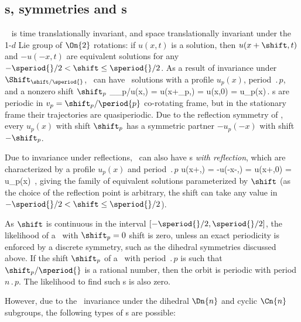 
\subsection{\Rpo s, symmetries and \po s} \label{sec:KSePO}

\KSe\  is time translationally invariant, and
space translationally invariant under the 1-$d$ Lie group of $\On{2}$
rotations: if $u(x,t)$ is a solution, then $u(x+\shift,t)$ and
$-u(-x,t)$ are equivalent solutions for any $-\speriod{}/2 < \shift \leq
\speriod{}/2$.
As a result of invariance under $\Shift_{\shift/\speriod{}}$,
\KSe\ can have \rpo\ solutions
with a profile $u_p(x)$, period $\period{p}$, and a
nonzero shift $\shift_p$
\beq
  \Shift_{\shift_p/\speriod{}}u(x,) =
  u(x+\shift_p,) = u(x,0) = u_p(x)\,.
\label{KSrpos}
\eeq
{\Rpo s}  are periodic in
$v_p=\shift_p/\period{p}$ co-rotating frame,
but in the stationary frame their
trajectories are quasiperiodic.  Due to the reflection symmetry
 of \KSe, every {\rpo} $u_p(x)$ with shift
$\shift_p$ has a symmetric partner $-u_p(-x)$ with shift $-\shift_p$.

Due to invariance under reflections, \KSe\ can also have
\rpo s {\em with reflection}, which are
characterized by a profile $u_p(x)$ and
period $\period{p}$
\beq
  \Refl u(x+\shift,) =
  -u(-x-\shift,) = u(x+\shift,0) = u_p(x)
  \,,
\label{KSpos}
\eeq
giving the family of equivalent solutions
parameterized by $\shift$
(as the choice of the reflection point is arbitrary,
the shift can take any value in $-\speriod{}/2 < \shift \leq \speriod{}/2$).

As $\shift$ is continuous in the interval $[-\speriod{}/2, \speriod{}/2]$,
the likelihood of a \rpo\ with $\shift_p = 0$ shift is zero,
unless an exact periodicity is enforced by a discrete symmetry,
such as the dihedral symmetries discussed above.
If the shift $\shift_p$ of a \rpo\ with period $\period{p}$ is such
that $\shift_p /\speriod{}$ is a rational number, then the orbit is
periodic with period $n\period{p}$.  The likelihood to find such \po s is
also zero.

However, due to the \KSe\ invariance under
the dihedral $\Dn{n}$ and cyclic $\Cn{n}$ subgroups, the following
types of \po s are possible:

